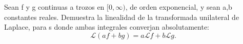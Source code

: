 Sean f y g continuas a trozos en \([0,\infty)\), de orden exponencial, y sean a,b constantes reales. Demuestra la linealidad de la transformada unilateral de Laplace, para s donde ambas integrales converjan absolutamente:
\[\mathcal L(af+bg)=a\mathcal Lf+b\mathcal Lg.\]
